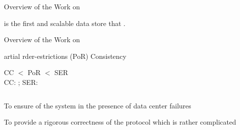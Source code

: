 
\begin{frame}{Overview of the Work on \unistore}
  \begin{center}
    \vspace{0.20cm}

    \vspace{1.00cm}
    \unistore{} is the first  and scalable  data store
    that .
  \end{center}
\end{frame}

\begin{frame}{Overview of the Work on \unistore}
  \begin{center}
    {artial rder-estrictions (PoR) Consistency}

    \vspace{0.30cm}
    CC $<$ PoR $<$ SER \\[6pt]
    CC: \cc; SER: \ser

    \pause
    \vspace{1.00cm}
    \begin{columns}
      \begin{description}[Challenges (II):]
        \setlength{\itemsep}{8pt}
        \item[Challenges (I):] To ensure  of the system in the presence of data
          center failures \pause
        \item[Challenges (II):] To provide a rigorous correctness  of the protocol
          which is rather complicated
      \end{description}
    \end{columns}
  \end{center}
\end{frame}

